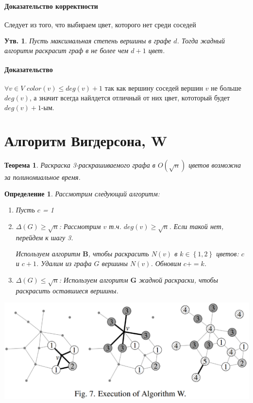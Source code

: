 \documentclass{article}
\newtheorem{theorem}{Теорема}
\newtheorem{lemma}{Утв.}
\newtheorem{definition}{Определение}
\begin{document}
\paragraph{Доказательство корректности}
Следует из того, что выбираем цвет, которого нет среди соседей
\hfill

\begin{lemma}
    Пусть максимальная степень вершины в графе $d$. Тогда жадный алгоритм раскрасит граф в не более чем $d + 1$ цвет.
\end{lemma}
\paragraph{Доказательство}
$\forall v \in V$ $color(v) \leq deg(v) + 1$ так как вершину соседей вершин $v$ не больше $deg(v)$, а значит всегда найлдется отличный от них цвет, кототорый будет $deg(v) + 1$-ым.

\section{Алгоритм Вигдерсона, \textbf{W}}

\begin{theorem}
    Раскраска 3-раскрашиваемого графа в $O(\sqrt{n})$ цветов возможна за полиномиальное время.
\end{theorem}

\begin{definition}
    Рассмотрим следующий алгоритм:
   
    \begin{enumerate}
    	\item Пусть $c$ = 1
    	\item $\Delta(G) \geq \sqrt{n}$: Рассмотрим $v$ т.ч. $deg(v) \geq \sqrt{n}$. Если такой нет, перейдем к шагу 3. 
    	
    	Используем алгоритм $\textbf{B}$, чтобы раскрасить $N(v)$ в $k \in \left\{1, 2\right\}$ цветов: $c$ и $c + 1$. Удалим из графа $G$ вершины $N(v)$. Обновим $c += k$.
    	
    	\item $\Delta(G) \le \sqrt{n}$: Используем алгоритм $\textbf{G}$ жадной раскраски, чтобы раскрасить оставшиеся вершины.
    \end{enumerate}
   
\end{definition}
\begin{center}
	\includegraphics[width=1\linewidth]{alg_sample}
\end{center}
\end{document}
